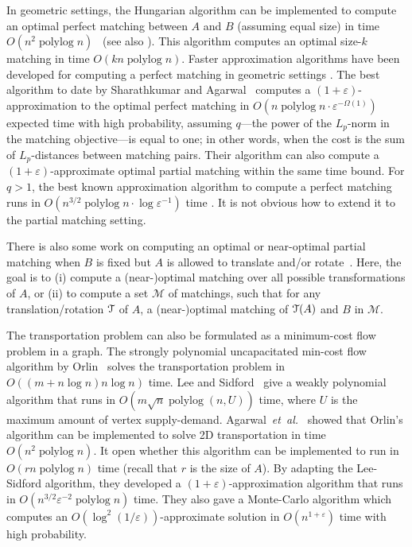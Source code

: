 \documentclass[a4paper,UKenglish]{socg-lipics-v2018}
\makeatletter
\def\etal{\emph{et~al.}}
\def\etal{\textit{et~al.}}
\def\polylog{\mathop{\mathrm{polylog}}}
\def\eps{\varepsilon}
\theoremstyle{plain}
\numberwithin{figure}{section}
\def\n@te#1{\textsf{\boldmath \textbf{$\langle\!\langle$#1$\rangle\!\rangle$}}\leavevmode}
\def\note#1{\textcolor{red}{\n@te{#1}}}
\renewcommand{\note}[1]{} %
\makeatother
\begin{document}
In geometric settings, the Hungarian algorithm can be implemented to compute
an optimal perfect matching between $A$ and $B$ (assuming equal size)
in time $O(n^2\polylog n)$~\cite{KMRSS17} (see also \cite{Vaidya89,AES99}).
This algorithm computes an optimal size-$k$ matching in time $O(kn\polylog n)$.
Faster approximation algorithms have been developed for computing a perfect
matching in geometric settings \cite{Vaidya89,V98,AV04,SA12}.
The best algorithm to date by Sharathkumar and Agarwal~\cite{SA12m}
computes a $(1+\eps)$-approximation to the optimal perfect matching in
$O(n\polylog n \cdot \eps^{-\Omega(1)})$ expected time with high probability,
assuming $q$---the power of the $L_p$-norm in the matching objective---is equal to one;
in other words, when the cost is the sum of $L_p$-distances between
matching pairs.
Their algorithm can also compute a $(1+\eps)$-approximate optimal partial
matching within the same time bound.
For $q > 1$, the best known approximation algorithm to compute a perfect
matching runs in $O(n^{3/2}\polylog n \cdot \log\eps^{-1})$ time \cite{SA12}.
It is not obvious how to extend it to the partial matching setting.

There is also some work on computing an optimal or near-optimal partial
matching when $B$ is fixed but $A$ is allowed to translate and/or rotate~\cite{CGKR08,R10,AHJKRST18,AKKMRSX18}.
Here, the goal is to (i) compute a (near-)optimal matching over all possible
transformations of $A$, or (ii) to compute a set $\mathcal{M}$ of matchings,
such that for any translation/rotation $\EuScript{T}$ of $A$, a (near-)optimal
matching of $\EuScript{T}(A)$ and $B$ in $\mathcal{M}$.

The transportation problem can also be formulated as a minimum-cost flow
problem in a graph.
The strongly polynomial uncapacitated min-cost flow algorithm by
Orlin~\cite{O93} solves the transportation problem in
$O((m + n\log n) n\log n)$ time.
Lee and Sidford~\cite{LS13b} give a weakly polynomial algorithm that runs in
$O(m\sqrt{n}\polylog(n, U))$ time, where $U$ is the maximum amount of vertex supply-demand.
Agarwal~\etal~\cite{AFPVX17} showed that Orlin's algorithm can be
implemented to solve 2D transportation in time $O(n^2\polylog n)$.
It open whether this algorithm can be implemented to run in
$O(rn\polylog n)$ time (recall that $r$ is the size of $A$).
By adapting the Lee-Sidford algorithm, they developed a
$(1+\eps)$-approximation algorithm that runs in $O(n^{3/2}\eps^{-2}\polylog n)$ time.
They also gave a Monte-Carlo algorithm which computes an
$O(\log^2(1/\eps))$-approximate solution in $O(n^{1+\eps})$ time with
high probability.
\end{document}
